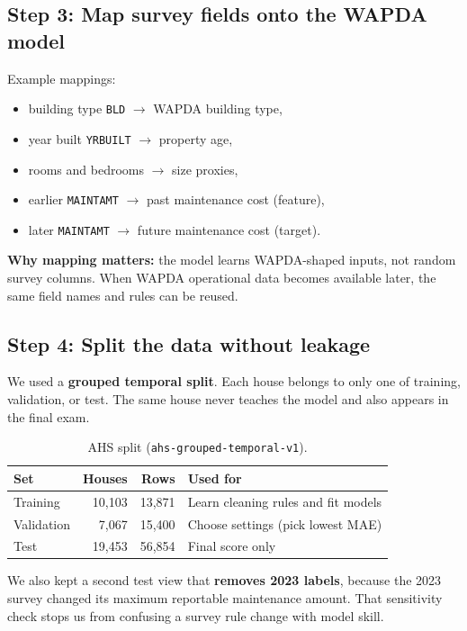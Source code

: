 \documentclass[11pt,a4paper]{article}
\begin{document}
\subsection{Step 3: Map survey fields onto the WAPDA model}

Example mappings:
\begin{itemize}
  \item building type \texttt{BLD} $\rightarrow$ WAPDA building type,
  \item year built \texttt{YRBUILT} $\rightarrow$ property age,
  \item rooms and bedrooms $\rightarrow$ size proxies,
  \item earlier \texttt{MAINTAMT} $\rightarrow$ past maintenance cost (feature),
  \item later \texttt{MAINTAMT} $\rightarrow$ future maintenance cost (target).
\end{itemize}

\textbf{Why mapping matters:} the model learns WAPDA-shaped inputs, not random survey columns. When WAPDA operational data becomes available later, the same field names and rules can be reused.

\subsection{Step 4: Split the data without leakage}

We used a \textbf{grouped temporal split}. Each house belongs to only one of training, validation, or test. The same house never teaches the model and also appears in the final exam.

\begin{table}[ht]
\centering
\caption{AHS split (\texttt{ahs-grouped-temporal-v1}).}
\begin{tabular}{@{}lrrl@{}}
\toprule
Set & Houses & Rows & Used for \\
\midrule
Training & 10,103 & 13,871 & Learn cleaning rules and fit models \\
Validation & 7,067 & 15,400 & Choose settings (pick lowest MAE) \\
Test & 19,453 & 56,854 & Final score only \\
\bottomrule
\end{tabular}
\end{table}

We also kept a second test view that \textbf{removes 2023 labels}, because the 2023 survey changed its maximum reportable maintenance amount. That sensitivity check stops us from confusing a survey rule change with model skill.
\end{document}

